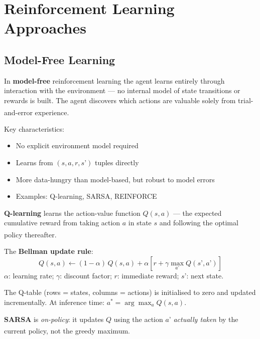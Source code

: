     \section{Reinforcement Learning Approaches}

    \subsection{Model-Free Learning}
    \begin{tcbitemize}[ skin=sectionraster ]

    \tcbitem[title=Model-Free RL, raster multicolumn=3]
    In \textbf{model-free} reinforcement learning the agent learns entirely through
    interaction with the environment --- no internal model of state transitions or
    rewards is built. The agent discovers which actions are valuable solely from
    trial-and-error experience.\textsuperscript{\cite[][p.~348]{hurbansGrokkingArtificialIntelligence2020}}

    Key characteristics:
    \begin{itemize}
        \item No explicit environment model required
        \item Learns from $(s, a, r, s’)$ tuples directly
        \item More data-hungry than model-based, but robust to model errors
        \item Examples: Q-learning, SARSA, REINFORCE
    \end{itemize}

    \tcbitem[title=The Q-Learning Update, raster multicolumn=3]
    \textbf{Q-learning} learns the action-value function $Q(s,a)$ --- the expected
    cumulative reward from taking action $a$ in state $s$ and following the
    optimal policy thereafter.\textsuperscript{\cite[][pp.~335--340]{hurbansGrokkingArtificialIntelligence2020}}

    The \textbf{Bellman update rule}:
    \begin{equation}
        Q(s,a) \leftarrow (1{-}\alpha)\,Q(s,a)
                 + \alpha\!\left[r + \gamma \max_{a’} Q(s’,a’)\right]
    \end{equation}
    $\alpha$: learning rate; $\gamma$: discount factor; $r$: immediate reward;
    $s’$: next state.

    The Q-table (rows = states, columns = actions) is initialised to zero and
    updated incrementally. At inference time: $a^* = \arg\max_a Q(s,a)$.

    \tcbitem[title={SARSA: On-Policy TD Control}, raster multicolumn=3]
    \textbf{SARSA} is \emph{on-policy}: it updates $Q$ using the action $a’$
    \emph{actually taken} by the current policy, not the greedy
    maximum.\textsuperscript{\cite[][Ch.~6]{suttonReinforcementLearningIntroduction2018}}


\end{tcbitemize}
